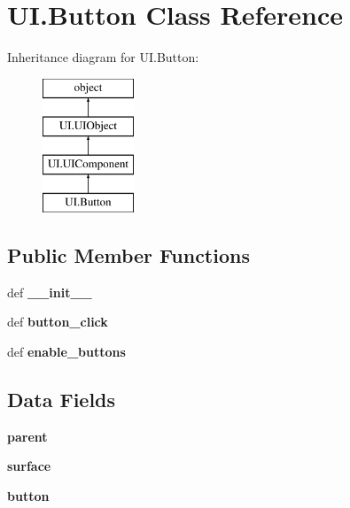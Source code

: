 \hypertarget{classUI_1_1Button}{\section{U\-I.\-Button Class Reference}
\label{classUI_1_1Button}
}
Inheritance diagram for U\-I.\-Button\-:\begin{figure}[H]
\begin{center}
\leavevmode
\includegraphics[height=4.000000cm]{classUI_1_1Button}
\end{center}
\end{figure}
\subsection*{Public Member Functions}
\begin{DoxyCompactItemize}
\item 
\hypertarget{classUI_1_1Button_aaffec11c22af344f6ff1dd12f64e1f76}{def {\bfseries \-\_\-\-\_\-init\-\_\-\-\_\-}}\label{classUI_1_1Button_aaffec11c22af344f6ff1dd12f64e1f76}

\item 
\hypertarget{classUI_1_1Button_a56560e47f3fe9a13deb863c8ae9f6370}{def {\bfseries button\-\_\-click}}\label{classUI_1_1Button_a56560e47f3fe9a13deb863c8ae9f6370}

\item 
\hypertarget{classUI_1_1Button_ae48553708f8cf5e878166f60d81a5999}{def {\bfseries enable\-\_\-buttons}}\label{classUI_1_1Button_ae48553708f8cf5e878166f60d81a5999}

\end{DoxyCompactItemize}
\subsection*{Data Fields}
\begin{DoxyCompactItemize}
\item 
\hypertarget{classUI_1_1Button_a959c354ded4f8a42b89d97e4abe7dc9b}{{\bfseries parent}}\label{classUI_1_1Button_a959c354ded4f8a42b89d97e4abe7dc9b}

\item 
\hypertarget{classUI_1_1Button_a2cd52c8b258fd7e839577692a85fc3ad}{{\bfseries surface}}\label{classUI_1_1Button_a2cd52c8b258fd7e839577692a85fc3ad}

\item 
\hypertarget{classUI_1_1Button_ac5647381d981b66e85f0d78fa6b5614f}{{\bfseries button}}\label{classUI_1_1Button_ac5647381d981b66e85f0d78fa6b5614f}

\end{DoxyCompactItemize}
